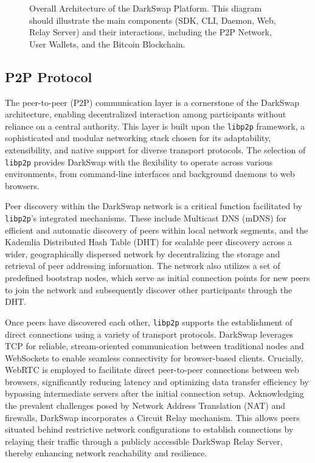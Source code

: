 \documentclass{article}
\begin{document}
\begin{figure}[h!]
    \centering
    \caption{Overall Architecture of the DarkSwap Platform. This diagram should illustrate the main components (SDK, CLI, Daemon, Web, Relay Server) and their interactions, including the P2P Network, User Wallets, and the Bitcoin Blockchain.}
    \label{fig:architecture}
\end{figure}


\subsection{P2P Protocol}
The peer-to-peer (P2P) communication layer is a cornerstone of the DarkSwap architecture, enabling decentralized interaction among participants without reliance on a central authority. This layer is built upon the \texttt{libp2p} framework, a sophisticated and modular networking stack chosen for its adaptability, extensibility, and native support for diverse transport protocols. The selection of \texttt{libp2p} provides DarkSwap with the flexibility to operate across various environments, from command-line interfaces and background daemons to web browsers.

Peer discovery within the DarkSwap network is a critical function facilitated by \texttt{libp2p}'s integrated mechanisms. These include Multicast DNS (mDNS) for efficient and automatic discovery of peers within local network segments, and the Kademlia Distributed Hash Table (DHT) for scalable peer discovery across a wider, geographically dispersed network by decentralizing the storage and retrieval of peer addressing information. The network also utilizes a set of predefined bootstrap nodes, which serve as initial connection points for new peers to join the network and subsequently discover other participants through the DHT.

Once peers have discovered each other, \texttt{libp2p} supports the establishment of direct connections using a variety of transport protocols. DarkSwap leverages TCP for reliable, stream-oriented communication between traditional nodes and WebSockets to enable seamless connectivity for browser-based clients. Crucially, WebRTC is employed to facilitate direct peer-to-peer connections between web browsers, significantly reducing latency and optimizing data transfer efficiency by bypassing intermediate servers after the initial connection setup. Acknowledging the prevalent challenges posed by Network Address Translation (NAT) and firewalls, DarkSwap incorporates a Circuit Relay mechanism. This allows peers situated behind restrictive network configurations to establish connections by relaying their traffic through a publicly accessible DarkSwap Relay Server, thereby enhancing network reachability and resilience.
\end{document}
